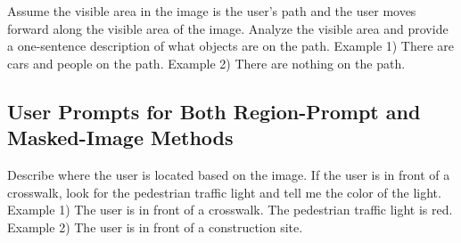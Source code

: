 \begin{tcolorbox}[
colback=green!10!white, 
colframe=green!50!black, 
rounded corners, 
boxrule=0.5mm, 
title=User prompt for path description,
width=\columnwidth]
Assume the visible area in the image is the user's path and the user moves forward along the visible area of the image. Analyze the visible area and provide a one-sentence description of what objects are on the path. Example 1) There are cars and people on the path. Example 2) There are nothing on the path. 
\end{tcolorbox}


\subsection{User Prompts for Both Region-Prompt and Masked-Image Methods}

\begin{tcolorbox}[
colback=orange!10!white, 
colframe=orange!50!black, 
rounded corners, 
boxrule=0.5mm, 
title=User prompt for whole image description,
width=\columnwidth]
Describe where the user is located based on the image. If the user is in front of a crosswalk, look for the pedestrian traffic light and tell me the color of the light. Example 1) The user is in front of a crosswalk. The pedestrian traffic light is red. Example 2) The user is in front of a construction site. 
\end{tcolorbox}

